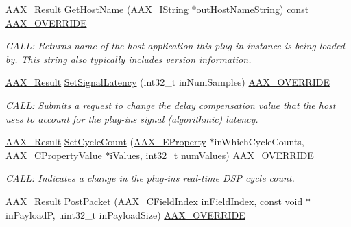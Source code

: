 \begin{DoxyCompactItemize}
\mbox{\hyperlink{a00392_a4d8f69a697df7f70c3a8e9b8ee130d2f}{A\+A\+X\+\_\+\+Result}} \mbox{\hyperlink{a01905_a085af48887bdd2eeb8d498b23ad236f9}{Get\+Host\+Name}} (\mbox{\hyperlink{a01873}{A\+A\+X\+\_\+\+I\+String}} $\ast$out\+Host\+Name\+String) const \mbox{\hyperlink{a00392_ac2f24a5172689ae684344abdcce55463}{A\+A\+X\+\_\+\+O\+V\+E\+R\+R\+I\+DE}}
\begin{DoxyCompactList}\small\item\em C\+A\+LL\+: Returns name of the host application this plug-\/in instance is being loaded by. This string also typically includes version information. \end{DoxyCompactList}\item 
\mbox{\hyperlink{a00392_a4d8f69a697df7f70c3a8e9b8ee130d2f}{A\+A\+X\+\_\+\+Result}} \mbox{\hyperlink{a01905_a6b4b924c94871b76a3bfdc7697384722}{Set\+Signal\+Latency}} (int32\+\_\+t in\+Num\+Samples) \mbox{\hyperlink{a00392_ac2f24a5172689ae684344abdcce55463}{A\+A\+X\+\_\+\+O\+V\+E\+R\+R\+I\+DE}}
\begin{DoxyCompactList}\small\item\em C\+A\+LL\+: Submits a request to change the delay compensation value that the host uses to account for the plug-\/in\textquotesingle{}s signal (algorithmic) latency. \end{DoxyCompactList}\item 
\mbox{\hyperlink{a00392_a4d8f69a697df7f70c3a8e9b8ee130d2f}{A\+A\+X\+\_\+\+Result}} \mbox{\hyperlink{a01905_ab0cd458b66e319fd14c2f1a17c7b678f}{Set\+Cycle\+Count}} (\mbox{\hyperlink{a00662_a13e384f22825afd3db6d68395b79ce0d}{A\+A\+X\+\_\+\+E\+Property}} $\ast$in\+Which\+Cycle\+Counts, \mbox{\hyperlink{a00392_ab247c0d8686c14e05cbb567ef276f249}{A\+A\+X\+\_\+\+C\+Property\+Value}} $\ast$i\+Values, int32\+\_\+t num\+Values) \mbox{\hyperlink{a00392_ac2f24a5172689ae684344abdcce55463}{A\+A\+X\+\_\+\+O\+V\+E\+R\+R\+I\+DE}}
\begin{DoxyCompactList}\small\item\em C\+A\+LL\+: Indicates a change in the plug-\/in\textquotesingle{}s real-\/time D\+SP cycle count. \end{DoxyCompactList}\item 
\mbox{\hyperlink{a00392_a4d8f69a697df7f70c3a8e9b8ee130d2f}{A\+A\+X\+\_\+\+Result}} \mbox{\hyperlink{a01905_a30fc3c2b59094709ff2f143aac3c2239}{Post\+Packet}} (\mbox{\hyperlink{a00392_ae807f8986143820cfb5d6da32165c9c7}{A\+A\+X\+\_\+\+C\+Field\+Index}} in\+Field\+Index, const void $\ast$in\+PayloadP, uint32\+\_\+t in\+Payload\+Size) \mbox{\hyperlink{a00392_ac2f24a5172689ae684344abdcce55463}{A\+A\+X\+\_\+\+O\+V\+E\+R\+R\+I\+DE}}

\end{DoxyCompactItemize}
